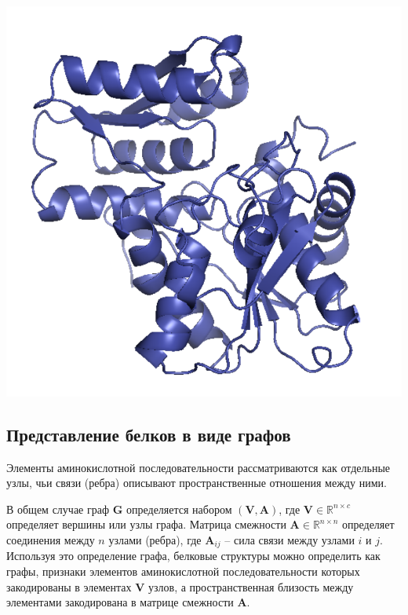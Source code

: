 \documentclass[12pt,twosides]{article}
\begin{document}
\begin{table}[H]
\begin{minipage}{0.45\linewidth}
{			\includegraphics[scale=0.25]{target_T0861.pdf}}
		\label{fig:edge}
	\end{minipage}
\end{table}

	\subsection{Представление белков в виде графов}
	Элементы аминокислотной последовательности рассматриваются как отдельные узлы, чьи связи (ребра) описывают пространственные отношения между ними. 
	
	В общем случае граф $\mathbf{G}$ определяется набором $\mathbf{(V, A)}$, где $\mathbf{V}\in \mathbb{R}^{n \times c}$ определяет вершины или узлы графа. Матрица смежности $\mathbf{A}\in \mathbb{R}^{n \times n}$ определяет соединения между $n$ узлами (ребра), где $\mathbf{A}_{ij}$ – сила связи между узлами $i$ и $j$. Используя это определение графа, белковые структуры можно определить как графы, признаки элементов аминокислотной последовательности которых закодированы в элементах $\mathbf{V}$ узлов, а пространственная близость между элементами закодирована в матрице смежности $\mathbf{A}$.
	
\end{document}
